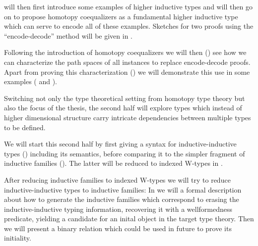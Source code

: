  will then first introduce some examples of higher inductive types
and will then go on to propose homotopy coequalizers as a fundamental higher
inductive type which can serve to encode all of these examples.
Sketches for two proofs using the ``encode-decode'' method will be given in
.

Following the introduction of homotopy coequalizers we will then ()
see how we can
characterize the path spaces of all instances to replace encode-decode proofs.
Apart from proving this characterization ()
we will demonstrate this use in some examples (
and ).

Switching not only the type theoretical setting from homotopy type theory
but also the focus of the thesis, the second half will explore types which
instead of higher dimensional structure carry intricate dependencies between
multiple types to be defined.

We will start this second half by first giving a syntax for inductive-inductive
types () including its semantics,
before comparing it to the simpler fragment of inductive families ().
The latter will be reduced to indexed W-types in .

After reducing inductive families to indexed W-types we will try to reduce
inductive-inductive types to inductive families:
In  we will a formal description about how to generate the
inductive families which correspond to
erasing the inductive-inductive typing information,
recovering it with a wellformedness predicate, yielding a candidate for an inital
object in the target type theory.
Then we will present a binary relation which could be used in future to prove
its initiality.










